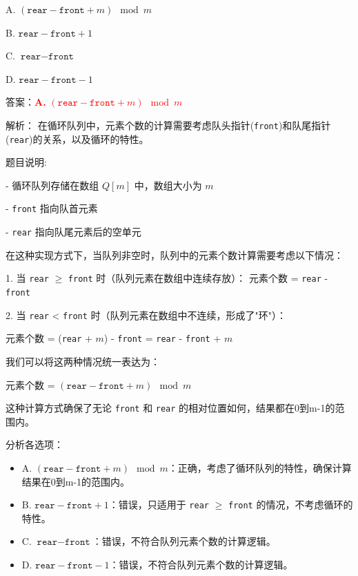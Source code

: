 \documentclass[lang=cn,newtx,10pt,scheme=chinese]{../../../elegantbook}
\begin{document}
\begin{enumerate}
    A. $(\texttt{rear} - \texttt{front} + m) \mod m$  

    B. $\texttt{rear} - \texttt{front} + 1$  

    C. $\texttt{rear} - \texttt{front}$  

    D. $\texttt{rear} - \texttt{front} - 1$  

    答案：\textcolor{red}{\textbf{A.} $(\texttt{rear} - \texttt{front} + m) \mod m$}

    解析：
    在循环队列中，元素个数的计算需要考虑队头指针(\texttt{front})和队尾指针(\texttt{rear})的关系，以及循环的特性。

    题目说明:

    - 循环队列存储在数组 $Q[m]$ 中，数组大小为 $m$

    - \texttt{front} 指向队首元素

    - \texttt{rear} 指向队尾元素后的空单元

    在这种实现方式下，当队列非空时，队列中的元素个数计算需要考虑以下情况：

    1. 当 \texttt{rear} $\geq$ \texttt{front} 时（队列元素在数组中连续存放）：
       元素个数 = \texttt{rear} - \texttt{front}

    2. 当 \texttt{rear} < \texttt{front} 时（队列元素在数组中不连续，形成了"环"）：

         元素个数 = (\texttt{rear} + $m$) - \texttt{front} = \texttt{rear} - \texttt{front} + $m$

    我们可以将这两种情况统一表达为：


    元素个数 = $(\texttt{rear} - \texttt{front} + m) \mod m$

    这种计算方式确保了无论 \texttt{front} 和 \texttt{rear} 的相对位置如何，结果都在0到m-1的范围内。

    分析各选项：
    \begin{itemize}
        \item A. $(\texttt{rear} - \texttt{front} + m) \mod m$：正确，考虑了循环队列的特性，确保计算结果在0到m-1的范围内。
        
        \item B. $\texttt{rear} - \texttt{front} + 1$：错误，只适用于 \texttt{rear} $\geq$ \texttt{front} 的情况，不考虑循环的特性。
        
        \item C. $\texttt{rear} - \texttt{front}$：错误，不符合队列元素个数的计算逻辑。
        
        \item D. $\texttt{rear} - \texttt{front} - 1$：错误，不符合队列元素个数的计算逻辑。
    \end{itemize}


\end{enumerate}
\end{document}
